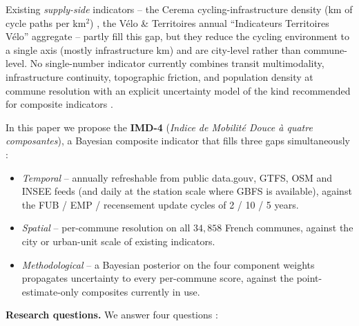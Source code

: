 \documentclass[11pt,a4paper]{article}
\begin{document}
Existing \emph{supply-side} indicators -- the Cerema cycling-infrastructure
density (km of cycle paths per km$^2$) \citep{Cerema2021Velo}, the
V\'elo \& Territoires annual ``Indicateurs Territoires V\'elo''
aggregate \citep{VeloTerritoires2023} -- partly fill this gap,
but they reduce the cycling environment to a single axis (mostly
infrastructure km) and are city-level rather than commune-level.  No
single-number indicator currently combines transit multimodality,
infrastructure continuity, topographic friction, and population
density at commune resolution with an explicit uncertainty model
of the kind recommended for composite indicators
\citep{OECD2008,Saisana2005}.

In this paper we propose the \textbf{IMD-4} (\emph{Indice de Mobilit\'e
Douce \`a quatre composantes}), a Bayesian composite indicator that
fills three gaps simultaneously :

\begin{itemize}[label=$\bullet$,leftmargin=*]
    \item \emph{Temporal} -- annually refreshable from public
          data.gouv, GTFS, OSM and INSEE feeds (and daily at the
          station scale where GBFS is available), against the FUB /
          EMP / recensement update cycles of 2 / 10 / 5 years.
    \item \emph{Spatial} -- per-commune resolution on all $34{,}858$
          French communes, against the city or urban-unit scale of
          existing indicators.
    \item \emph{Methodological} -- a Bayesian posterior on the
          four component weights propagates uncertainty to every
          per-commune score, against the point-estimate-only
          composites currently in use.
\end{itemize}

\noindent\textbf{Research questions.}
We answer four questions :
\end{document}

